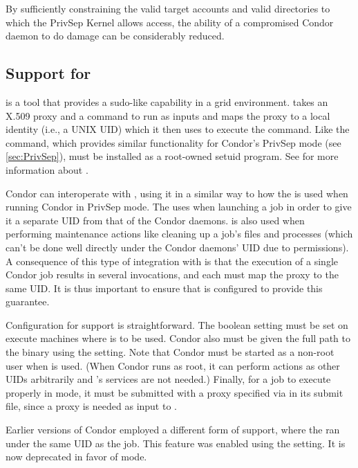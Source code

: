 By sufficiently constraining the valid target
accounts and valid directories to which the PrivSep Kernel allows
access, the ability of a compromised Condor daemon to do damage can
be considerably reduced.

\subsection{\label{sec:glexec}Support for }

 is a tool that provides a sudo-like capability in a grid
environment.  takes an X.509 proxy and a command to run as
inputs and maps the proxy to a local identity (i.e., a UNIX UID) which
it then uses to execute the command. Like the 
command, which provides similar functionality for Condor's PrivSep mode
(see \ref{sec:PrivSep}),  must be installed as a root-owned
setuid program. See 
for more information about .

Condor can interoperate with , using it in a similar way
to how the  is used when running Condor in
PrivSep mode. The  uses  when launching
a job in order to give it a separate UID from that of the Condor daemons.
 is also used when performing maintenance actions like
cleaning up a job's files and processes (which can't be done well
directly under the Condor daemons' UID due to permissions). A consequence
of this type of integration with  is that the execution
of a single Condor job results in several  invocations, and
each must map the proxy to the same UID. It is thus important to ensure
that  is configured to provide this guarantee.

Configuration for  support is straightforward. The boolean
 setting must be set  on execute machines
where  is to be used. Condor also must be given the full
path to the  binary using the  setting. Note
that Condor must be started as a non-root user when  is used.
(When Condor runs as root, it can perform actions as other UIDs arbitrarily
and 's services are not needed.) Finally, for a job to execute
properly in  mode, it must be submitted with a proxy
specified via  in its submit file, since a
proxy is needed as input to .

Earlier versions of Condor employed a different form of 
support, where the  ran under the same UID as the job.
This feature was enabled using the  setting. It
is now deprecated in favor of  mode.
